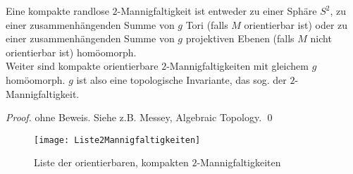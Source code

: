 \begin{theorem}
  Eine kompakte randlose \( 2 \)-Mannigfaltigkeit ist entweder zu einer Sphäre \( S^2 \), zu einer zusammenhängenden Summe von \( g \) Tori (falls \( M \) orientierbar ist) oder zu einer zusammenhängenden Summe von \( g \) projektiven Ebenen (falls \( M \) nicht orientierbar ist) homöomorph. \\
  Weiter sind kompakte orientierbare \( 2 \)-Mannigfaltigkeiten mit gleichem \( g \) homöomorph. \( g \) ist also eine topologische Invariante, das sog. \label{def:geschlecht} der \( 2 \)-Mannigfaltigkeit.
  \begin{proof}
    ohne Beweis. Siehe z.B. Messey, Algebraic Topology. \qed{}
  \end{proof}
\end{theorem}

\begin{figure}[H]
  \texttt{[image: Liste2Mannigfaltigkeiten]}
  \caption{Liste der orientierbaren, kompakten \( 2 \)-Mannigfaltigkeiten}
\end{figure}

